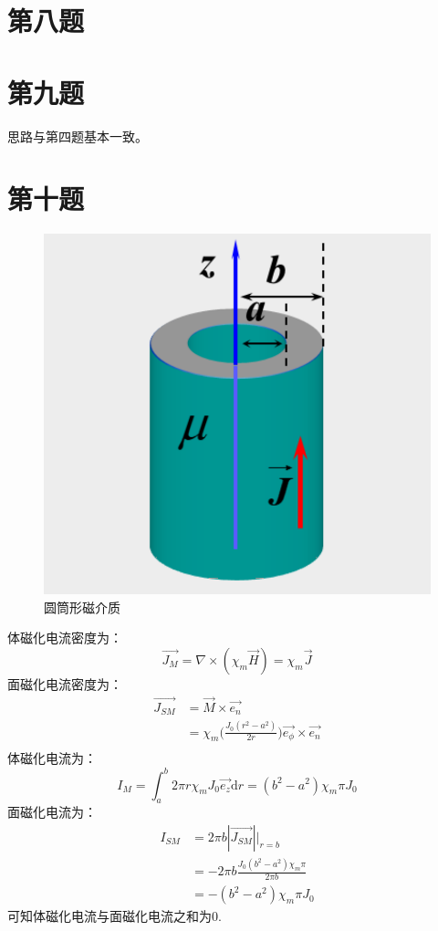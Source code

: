 \documentclass[a4paper]{article}
\begin{document}
	\section{第八题}

	\section{第九题}
		思路与第四题基本一致。
	\section{第十题}
		\begin{figure}[htbp]
			\centering
			\includegraphics[scale=0.5]{10.png}
			\caption{圆筒形磁介质}
		\end{figure}
		体磁化电流密度为：
		\begin{equation}
			\vec{J_M} = \nabla \times (\chi_m \vec{H})=\chi_m \vec{J}
		\end{equation}
		面磁化电流密度为：
		\begin{equation}
			\begin{split}
				\vec{J_{SM}} &= \vec{M} \times \vec{e_n}\\
				&= \chi_m \bigg(\frac{J_0 (r^2 - a^2)}{2r} \bigg) \vec{e_\phi} \times \vec{e_n}\\
			\end{split}
		\end{equation}
		体磁化电流为：
		\begin{equation}
			I_M = \int _a ^b 2\pi r\chi_m J_0 \vec{e_z}\mathrm{d}r = (b^2 - a^2)\chi_m\pi J_0
		\end{equation}
		面磁化电流为：
		\begin{equation}
			\begin{split}
				I_{SM} &= 2\pi b|\vec{J_{SM}}| \bigg| _{r=b}\\
				&= -2\pi b \frac{J_0(b^2 - a^2)\chi_m\pi}{2\pi b}\\
				&= -(b^2 - a^2)\chi_m \pi J_0
			\end{split}
		\end{equation}
		可知体磁化电流与面磁化电流之和为0.
\end{document}
